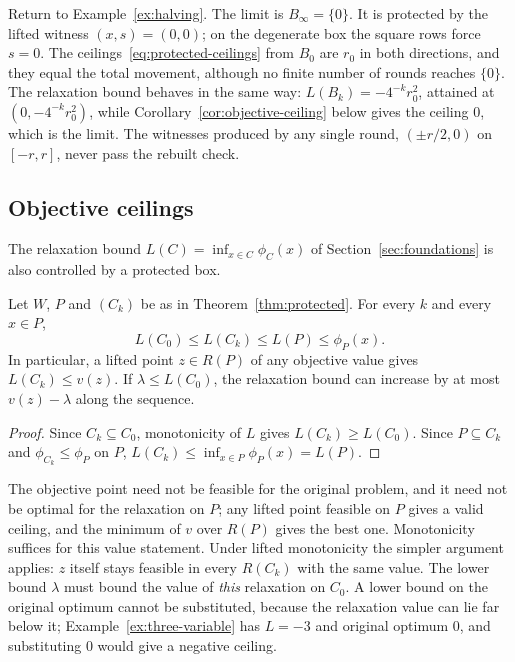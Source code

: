 \begin{example}\label{ex:sharp-halving}
Return to Example~\ref{ex:halving}. The limit is $B_\infty=\{0\}$. It is
protected by the lifted witness $(x,s)=(0,0)$; on the degenerate box the
square rows force $s=0$. The ceilings~\eqref{eq:protected-ceilings} from
$B_0$ are $r_0$ in both directions, and they equal the total movement,
although no finite number of rounds reaches $\{0\}$. The relaxation bound
behaves in the same way: $L(B_k)=-4^{-k}r_0^2$, attained at
$(0,-4^{-k}r_0^2)$, while Corollary~\ref{cor:objective-ceiling} below
gives the ceiling $0$, which is the limit. The witnesses produced by any
single round, $(\pm r/2,0)$ on $[-r,r]$, never pass the rebuilt check.
\end{example}

\subsection{Objective ceilings}\label{sec:cert-objective}

The relaxation bound $L(C)=\inf_{x\in C}\phi_C(x)$ of
Section~\ref{sec:foundations} is also controlled by a protected box.

\begin{corollary}\label{cor:objective-ceiling}
Let $W$, $P$ and $(C_k)$ be as in Theorem~\ref{thm:protected}. For every
$k$ and every $x\in P$,
\begin{equation}\label{eq:objective-ceiling}
 L(C_0)\le L(C_k)\le L(P)\le\phi_P(x).
\end{equation}
In particular, a lifted point $z\in R(P)$ of any objective value gives
$L(C_k)\le v(z)$. If $\lambda\le L(C_0)$, the relaxation bound can
increase by at most $v(z)-\lambda$ along the sequence.
\end{corollary}
\begin{proof}
Since $C_k\subseteq C_0$, monotonicity of $L$ gives $L(C_k)\ge L(C_0)$.
Since $P\subseteq C_k$ and $\phi_{C_k}\le\phi_P$ on $P$,
$L(C_k)\le\inf_{x\in P}\phi_P(x)=L(P)$.
\end{proof}

The objective point need not be feasible for the original problem, and
it need not be optimal for the relaxation on $P$; any lifted point
feasible on $P$ gives a valid ceiling, and the minimum of $v$ over $R(P)$
gives the best one. Monotonicity suffices for this value statement.
Under lifted monotonicity the simpler argument applies: $z$ itself stays
feasible in every $R(C_k)$ with the same value. The lower bound $\lambda$
must bound the value of \emph{this} relaxation on $C_0$. A lower bound on
the original optimum cannot be substituted, because the relaxation value
can lie far below it; Example~\ref{ex:three-variable} has $L=-3$ and
original optimum $0$, and substituting $0$ would give a negative ceiling.

